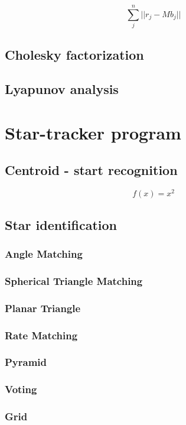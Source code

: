 \documentclass[12pt,a4paper,oneside]{article}
\begin{document}
\begin{equation}
\sum_j^n ||r_j - Mb_j||
\end{equation}
\subsection{Cholesky factorization}
\subsection{Lyapunov analysis}

\newpage
\section{Star-tracker program}
\subsection{Centroid - start recognition}
\begin{equation}
f(x) = x^2
\end{equation}
\subsection{Star identification}
\subsubsection{Angle Matching}
\subsubsection{Spherical Triangle Matching}
\subsubsection{Planar Triangle}
\subsubsection{Rate Matching}
\subsubsection{Pyramid}
\subsubsection{Voting}
\subsubsection{Grid}
\end{document}
